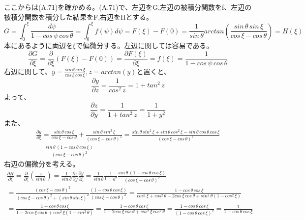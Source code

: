 \documentclass{jsarticle}
\begin{document}
ここからは(A.71)を確かめる。(A.71)で、左辺をG,左辺の被積分関数をf、左辺の被積分関数を積分した結果をF,右辺をHとする。
\begin{equation}
G = \int_0^{\xi} \frac{d\psi}{1-cos\,\psi\,cos\,\theta} = \int_0^{\xi} f(\psi)d\psi = F(\xi) - F(0) = \frac{1}{sin\,\theta}arctan(\frac{sin\,\theta\,sin\,\xi}{cos\,\xi - cos\,\theta})=H(\xi)
\end{equation}
本にあるように両辺を$\xi$で偏微分する。左辺に関しては容易である。
\begin{equation}
\frac{\partial G}{\partial \xi} = \frac{\partial}{\partial \xi}(F(\xi) - F(0)) = \frac{\partial F(\xi)}{\partial \xi} = f(\xi) = \frac{1}{1 - cos\,\psi\, cos\,\theta}
\end{equation}
右辺に関して、$y = \frac{sin\,\theta\,sin\,\xi}{cos\,\xi\,cos\,\xi}, z = arctan(y)$と置くと、
\begin{equation}
\frac{\partial y}{\partial z} = \frac{1}{cos^2\,z} = 1 + tan^2\,z
\end{equation}
よって、
\begin{equation}
\frac{\partial z}{\partial y} = \frac{1}{1 + tan^2\,z} = \frac{1}{1 + y^2}
\end{equation}
また、
\begin{equation}
\begin{split}
\frac{\partial y}{\partial \xi} = \frac{sin\,\theta\,cos\,\xi}{cos\,\xi - cos\,\theta} + \frac{sin\,\theta\,sin^2\,\xi}{(cos\,\xi - cos\,\theta)^2}
= \frac{sin\,\theta\,sin^2\,\xi + sin\,\theta\,cos^2\,\xi - sin\,\theta\,cos\,\theta\,cos\,\xi}{(cos\,\xi - cos\,\theta)^2}\\
= \frac{sin\,\theta\,(1 - cos\,\theta\,cos\,\xi)}{(cos\,\xi - cos\,\theta)^2}
\end{split}
\end{equation}
右辺の偏微分を考える。
\begin{equation}
\begin{split}
\frac{\partial H}{\partial \xi} = \frac{\partial}{\partial \xi}(\frac{z}{sin\,\theta}) 
= \frac{1}{sin\,\theta} \frac{\partial z}{\partial y} \frac{\partial y}{\partial \xi}
= \frac{1}{sin\,\theta} \frac{1}{1 + y^2} \frac{sin\,\theta\,(1 - cos\,\theta\,cos\,\xi)}{(cos\,\xi - cos\,\theta)^2}\\
= \frac{(cos\,\xi - cos\,\theta)^2}{(cos\,\xi - cos\,\theta)^2 + (sin\,\theta\,sin\,\xi)^2} \frac{(1 - cos\,\theta\,cos\,\xi)}{(cos\,\xi - cos\,\theta)^2}
= \frac{1 - cos\,\theta\,cos\,\xi}{cos^2\,\xi + cos^2\,\theta - 2cos\,\xi\,cos\,\theta + sin^2\,\theta(1-cos^2\,\xi)}\\
= \frac{1 - cos\,\theta\,cos\,\xi}{1 - 2cos\,\xi\,cos\,\theta + cos^2\,\xi (1 - sin^2\,\theta)}
= \frac{1 - cos\,\theta\,cos\,\xi}{1 - 2cos\,\xi\,cos\,\theta + cos^2\,\xi \, cos^2\,\theta}
= \frac{1 - cos\,\theta\,cos\,\xi}{(1 - cos\,\theta\,cos\,\xi)^2}
= \frac{1}{1 - cos\,\theta\,cos\,\xi}
\end{split}
\end{equation}
\end{document}
